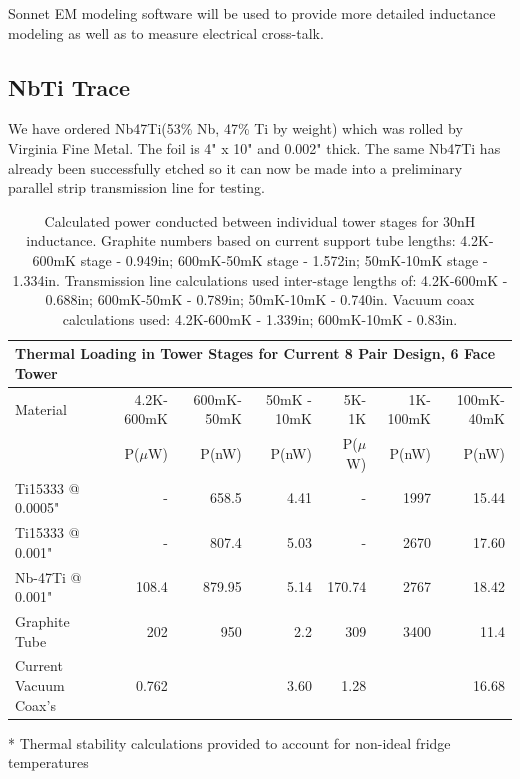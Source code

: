 \documentclass{report}
\begin{document}
\begin{multicols}{2}
Sonnet EM modeling software will be used to provide more detailed inductance modeling as well as to measure electrical cross-talk.

\subsection{NbTi Trace}

We have ordered Nb47Ti(53\% Nb, 47\% Ti by weight) which was rolled by Virginia Fine Metal. The foil is 4" x 10" and 0.002" thick. The same Nb47Ti has already been successfully etched so it can now be made into a preliminary parallel strip transmission line for testing.

\begin{table}[ht]
\centering
\begin{threeparttable}
{\footnotesize\rm\begin{tabular}{l|rrrrrr}
  \multicolumn{7}{l}{{\large Thermal Loading in Tower Stages for Current 8 Pair Design, 6 Face Tower}}\\
\toprule
 {\normalsize Material} & 4.2K-600mK & 600mK-50mK & 50mK - 10mK & 5K-1K\tnote{*} & 1K-100mK\tnote{*} & 100mK-40mK\tnote{*} \\
  &P($\mu$W)&P(nW)&P(nW)&P($\mu$W)& P(nW) & P(nW) \\ \hline\hline
  Ti15333 @ 0.0005" & - & 658.5 & 4.41 & - & 1997 & 15.44 \\
  Ti15333 @ 0.001" & - & 807.4 & 5.03 & - & 2670 & 17.60 \\
  Nb-47Ti @ 0.001" & 108.4 & 879.95 & 5.14  & 170.74 & 2767 & 18.42 \\
  Graphite Tube & 202 & 950 & 2.2 & 309 & 3400 & 11.4 \\
  Current Vacuum Coax's & 0.762 & \multicolumn{2}{r}{3.60} & 1.28 & \multicolumn{2}{r}{16.68} \\
\bottomrule
\end{tabular}
\begin{tablenotes}
   \item[*]{Thermal stability calculations provided to account for non-ideal fridge temperatures}
\end{tablenotes}}
\caption{Calculated power conducted between individual tower stages for 30nH inductance. Graphite numbers based on current support tube lengths: 4.2K-600mK stage - 0.949in; 600mK-50mK
stage - 1.572in; 50mK-10mK stage - 1.334in. Transmission line calculations used inter-stage lengths of: 4.2K-600mK - 0.688in; 600mK-50mK - 0.789in; 50mK-10mK - 0.740in. Vacuum coax
calculations used: 4.2K-600mK - 1.339in; 600mK-10mK - 0.83in. }
\end{threeparttable}
\end{table}


\end{multicols}
\end{document}
